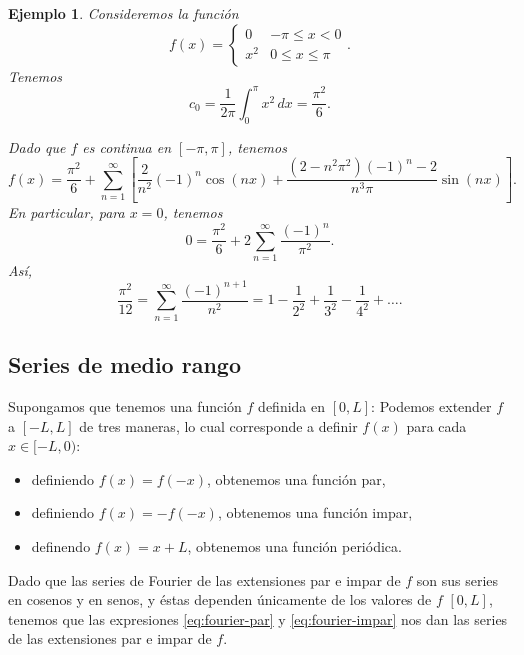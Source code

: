 \documentclass[11pt,letterpaper]{report}
\newtheorem{example}[defn]{Ejemplo}
\newcommand\<{\langle}
\renewcommand\>{\rangle}
\begin{document}
\begin{example}
  Consideremos la función
  \[
    f(x) =
    \begin{cases}
      0 & -\pi\leq x<0 \\
      x^{2} & 0\leq x\leq\pi
    \end{cases}
  .\]
  Tenemos
  \[
    c_0 = \frac{1}{2\pi}\int_{0}^{\pi}x^{2}\,dx = \frac{\pi^{2}}{6}
  .\]
  
  Dado que $f$ es continua en $[-\pi,\pi]$, tenemos
  \[
    f(x)
    =
    \frac{\pi^{2}}{6}
    +
    \sum_{n=1}^{\infty} \left[
      \frac{2}{n^{2}}(-1)^{n}\cos(nx)
      +
      \frac{(2-n^{2}\pi^{2})(-1)^{n}-2}{n^{3}\pi}
      \sin(nx)
    \right]
  .\]
  En particular, para $x=0$, tenemos
  \[
    0
    =
    \frac{\pi^{2}}{6}
    +
    2\sum_{n=1}^{\infty}\frac{(-1)^{n}}{\pi^{2}}
  .\]
  Así,
  \[
    \frac{\pi^{2}}{12}
    =
    \sum_{n=1}^{\infty}\frac{(-1)^{n+1}}{n^{2}}
    =
    1-\frac{1}{2^{2}}+\frac{1}{3^{2}}-\frac{1}{4^{2}}+\dots
  .\]
\end{example}

\subsection{Series de medio rango}

Supongamos que tenemos una función $f$ definida en $[0,L]$:
Podemos extender $f$ a $[-L,L]$ de tres maneras, lo cual corresponde a
definir $f(x)$ para cada $x\in[-L,0)$:
\begin{itemize}
  \item definiendo $f(x)=f(-x)$, obtenemos una función par,
  \item definiendo $f(x)=-f(-x)$, obtenemos una función impar,
  \item definendo $f(x)=x+L$, obtenemos una función periódica.
\end{itemize}

Dado que las series de Fourier de las extensiones par e impar de $f$
son sus series en cosenos y en senos, y éstas dependen únicamente de
los valores de $f$ $[0,L]$, tenemos que las
expresiones \eqref{eq:fourier-par} y \eqref{eq:fourier-impar}
nos dan las series de las extensiones par e impar de $f$.
\end{document}
